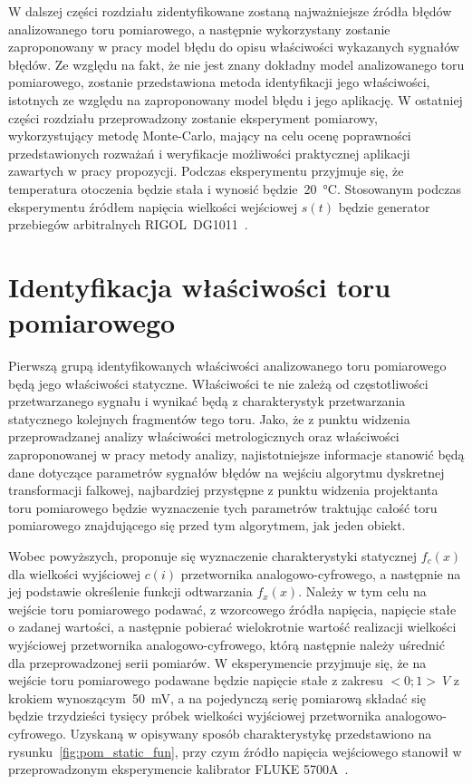 W dalszej części rozdziału zidentyfikowane zostaną najważniejsze źródła błędów analizowanego toru pomiarowego, a następnie wykorzystany zostanie zaproponowany w pracy model błędu do opisu właściwości wykazanych sygnałów błędów. Ze względu na fakt, że nie jest znany dokładny model analizowanego toru pomiarowego, zostanie przedstawiona metoda identyfikacji jego właściwości, istotnych ze względu na zaproponowany model błędu i jego aplikację. W ostatniej części rozdziału przeprowadzony zostanie eksperyment pomiarowy, wykorzystujący metodę Monte-Carlo, mający na celu ocenę poprawności przedstawionych rozważań i weryfikacje możliwości praktycznej aplikacji zawartych w pracy propozycji. Podczas eksperymentu przyjmuje się, że temperatura otoczenia będzie stała i wynosić będzie~\qty{20}{\degreeCelsius}. Stosowanym podczas eksperymentu źródłem napięcia wielkości wejściowej $s(t)$ będzie generator przebiegów arbitralnych RIGOL~DG1011~\cite{rigol_manual}.

\section{Identyfikacja właściwości toru pomiarowego}

Pierwszą grupą identyfikowanych właściwości analizowanego toru pomiarowego będą jego właściwości statyczne. Właściwości te nie zależą od częstotliwości przetwarzanego sygnału i wynikać będą z charakterystyk przetwarzania statycznego kolejnych fragmentów tego toru. Jako, że z punktu widzenia przeprowadzanej analizy właściwości metrologicznych oraz właściwości zaproponowanej w pracy metody analizy, najistotniejsze informacje stanowić będą dane dotyczące parametrów sygnałów błędów na wejściu algorytmu dyskretnej transformacji falkowej, najbardziej przystępne z punktu widzenia projektanta toru pomiarowego będzie wyznaczenie tych parametrów traktując całość toru pomiarowego znajdującego się przed tym algorytmem, jak jeden obiekt.

Wobec powyższych, proponuje się wyznaczenie charakterystyki statycznej $f_{c}(x)$ dla wielkości wyjściowej $c(i)$ przetwornika analogowo-cyfrowego, a następnie na jej podstawie określenie funkcji odtwarzania $f_{x}(x)$. Należy w tym celu na wejście toru pomiarowego podawać, z wzorcowego źródła napięcia, napięcie stałe o zadanej wartości, a następnie pobierać wielokrotnie wartość realizacji wielkości wyjściowej przetwornika analogowo-cyfrowego, którą następnie należy uśrednić dla przeprowadzonej serii pomiarów. W eksperymencie przyjmuje się, że na wejście toru pomiarowego podawane będzie napięcie stałe z zakresu $<0;1>~\unit{V}$ z krokiem wynoszącym~\qty{50}{mV}, a na pojedynczą serię pomiarową składać się będzie trzydzieści tysięcy próbek wielkości wyjściowej przetwornika analogowo-cyfrowego. Uzyskaną w opisywany sposób charakterystykę przedstawiono na rysunku~\ref{fig:pom_static_fun}, przy czym źródło napięcia wejściowego stanowił w przeprowadzonym eksperymencie kalibrator FLUKE 5700A~\cite{fluke_manual}.

